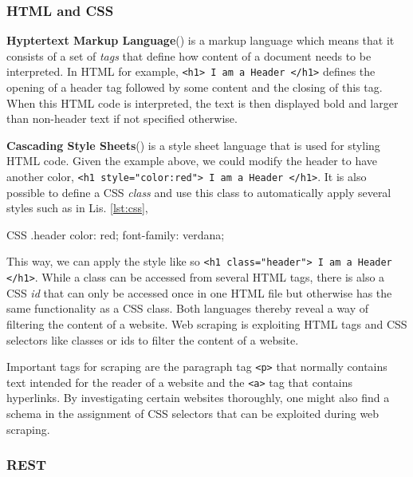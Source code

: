 \subsubsection{HTML and CSS}
\textbf{Hyptertext Markup Language}() is a markup language which means that it consists of a set of \textsl{tags} that define how content of a document needs to be interpreted. In HTML for example, \texttt{<h1> I am a Header </h1>} defines the opening of a header tag followed by some content and the closing of this tag. When this HTML code is interpreted, the text is then displayed bold and larger than non-header text if not specified otherwise.

\textbf{Cascading Style Sheets}() is a style sheet language that is used for styling HTML code. Given the example above, we could modify the header to have another color, \texttt{<h1 style="color:red">  I am a Header </h1>}. It is also possible to define a CSS \emph{class} and use this class to automatically apply several styles such as in Lis. \ref{lst:css},\renewcommand{\figurename}{Listing}

\begin{listing}[h!]
  \centering
  \begin{cminted}{CSS}
    .header {
      color: red;
      font-family: verdana;
    }
  \end{cminted}
  \caption{CSS class named \emph{header} that sets the font to verdana and color to red when used.}
  \label{lst:css}
\end{listing}

This way, we can apply the style like so \texttt{<h1 class="header"> I am a Header </h1>}. While a class can be accessed from several HTML tags, there is also a CSS \emph{id} that can only be accessed once in one HTML file but otherwise has the same functionality as a CSS class.
Both languages thereby reveal a way of filtering the content of a website. Web scraping is exploiting HTML tags and CSS selectors like classes or ids to filter the content of a website.

Important tags for scraping are the paragraph tag \texttt{<p>} that normally contains text intended for the reader of a website and the \texttt{<a>} tag that contains hyperlinks. By investigating certain websites thoroughly, one might also find a schema in the assignment of CSS selectors that can be exploited during web scraping.

\subsubsection{REST}

